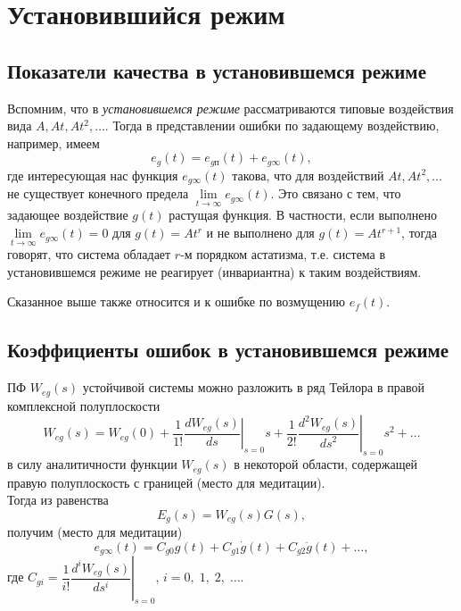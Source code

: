 \documentclass[../../TAU.tex]{subfiles}
\begin{document}

\section{Установившийся режим}

\subsection{Показатели качества в установившемся режиме }

    Вспомним, что в {\it установившемся режиме} рассматриваются типовые воздействия вида $A,At, At^2, \ldots$. Тогда в представлении ошибки по задающему воздействию, например, имеем
    $$
        e_g(t) = e_{gп}(t) + e_{g\infty}(t),
    $$
    где интересующая нас функция $e_{g\infty}(t)$ такова, что для воздействий $At, At^2, \ldots$ не существует конечного предела $\lim\limits_{t\rightarrow\infty} e_{g\infty}(t)$. Это связано с тем, что задающее воздействие $g(t)$ растущая функция. В частности, если выполнено $\lim\limits_{t\rightarrow\infty} e_{g\infty}(t)=0$ для $g(t) = At^r$ и не выполнено для $g(t) = At^{r+1}$, тогда говорят, что система обладает $r$-м порядком астатизма, т.е. система в установившемся режиме не реагирует (инвариантна) к таким воздействиям.

    Сказанное выше также относится и к ошибке по возмущению $e_f(t)$.

\subsection{Коэффициенты ошибок в установившемся режиме}
\label{sec:errors}

    ПФ $W_{eg}(s) $ устойчивой системы можно разложить в ряд Тейлора в правой комплексной полуплоскости
    $$
        W_{eg}(s) = W_{eg}(0) + \frac{1}{1!}\left.\frac{dW_{eg}(s)}{ds}\right|_{s=0}s + \frac{1}{2!}\left.\frac{d^2W_{eg}(s)}{{ds}^2}\right|_{s=0}s^2 + \ldots
    $$
    в силу аналитичности функции $W_{eg}(s)$ в некоторой области, содержащей правую полуплоскость с границей (место для медитации). \\
    Тогда из равенства
    $$
        E_g(s) = W_{eg}(s) G(s),
    $$
    получим (место для медитации)
    $$
        e_{g\infty}(t) = C_{g0} g(t) + C_{g1} \dot g(t) + C_{g2} \ddot g(t) + \ldots,
    $$
    где $C_{gi} =\dfrac{1}{i!}\left.\dfrac{d^iW_{eg}(s)}{ds^i}\right|_{s=0}$, $i=0,\;1,\;2,\;\ldots$.
\end{document}

